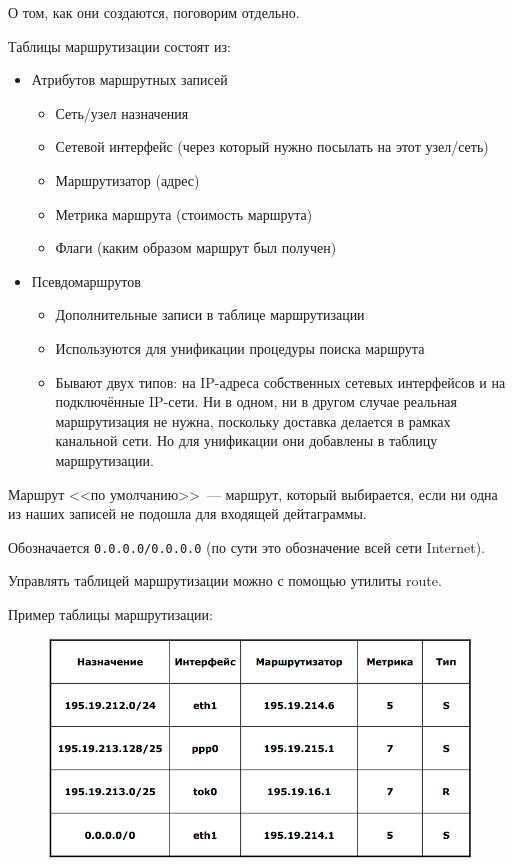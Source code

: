 О том, как они создаются, поговорим отдельно.

Таблицы маршрутизации состоят из:
\begin{itemize}
    \item Атрибутов маршрутных записей
    \begin{itemize}
        \item Сеть/узел назначения
        \item Сетевой интерфейс (через который нужно посылать на этот узел/сеть)
        \item Маршрутизатор (адрес)
        \item Метрика маршрута (стоимость маршрута)
        \item Флаги (каким образом маршрут был получен)
    \end{itemize}
    \item Псевдомаршрутов
    \begin{itemize}
        \item Дополнительные записи в таблице маршрутизации
        \item Используются для унификации процедуры поиска маршрута
        \item Бывают двух типов: на IP-адреса собственных сетевых интерфейсов и на подключённые IP-сети. Ни в одном, ни в другом случае реальная маршрутизация не нужна, поскольку доставка делается в рамках канальной сети. Но для унификации они добавлены в таблицу маршрутизации.
    \end{itemize}
\end{itemize}

Маршрут <<по умолчанию>>~--- маршрут, который выбирается, если ни одна из наших записей не подошла для входящей дейтаграммы.

Обозначается {\tt 0.0.0.0/0.0.0.0} (по сути это обозначение всей сети Internet). 

Управлять таблицей маршрутизации можно с помощью утилиты route.

Пример таблицы маршрутизации:

\begin{figure}[H]
  \centering
  \includegraphics[width=15cm]{images/04/02}
\end{figure}

